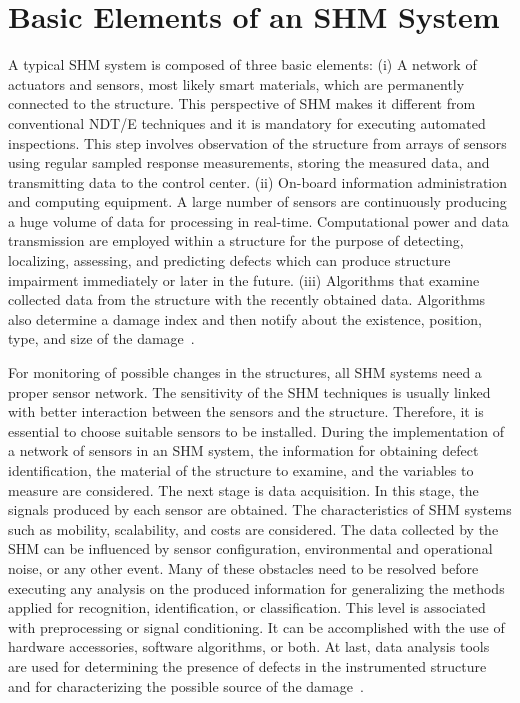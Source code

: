 \documentclass[b5paper, 11pt, titlepage]{book}
\begin{document}
\section{Basic Elements of an SHM System}
A typical SHM system is composed of three basic elements: (i) A network of actuators and sensors, most likely smart materials, which are permanently connected to the structure. This perspective of SHM makes it different from conventional NDT/E techniques and it is mandatory for executing automated inspections. This step involves observation of the structure from arrays of sensors using regular sampled response measurements, storing the measured data, and transmitting data to the control center. (ii) On-board information administration and computing equipment. A large number of sensors are continuously producing a huge volume of data for processing in real-time. Computational power and data transmission are employed within a structure for the purpose of detecting, localizing, assessing, and predicting defects which can produce structure impairment immediately or later in the future. (iii) Algorithms that examine collected data from the structure with the recently obtained data. Algorithms also determine a damage index and then notify about the existence, position, type, and size of the damage~\cite{stepinski2013advanced, Guemes2020a, lee2008overview, Crane2017}.

For monitoring of possible changes in the structures, all SHM systems need a proper sensor network. The sensitivity of the SHM techniques is usually linked with better interaction between the sensors and the structure. Therefore, it is essential to choose suitable sensors to be installed. During the implementation of a network of sensors in an SHM system, the information for obtaining defect identification, the material of the structure to examine, and the variables to measure are considered. The next stage is data acquisition. In this stage, the signals produced by each sensor are obtained. The characteristics of SHM systems such as mobility, scalability, and costs are considered. The data collected by the SHM can be influenced by sensor configuration, environmental and operational noise, or any other event. Many of these obstacles need to be resolved before executing any analysis on the produced information for generalizing the methods applied for recognition, identification, or classification. This level is associated with preprocessing or signal conditioning. It can be accomplished with the use of hardware accessories, software algorithms, or both. At last, data analysis tools are used for determining the presence of defects in the instrumented structure and for characterizing the possible source of the damage~\cite{TibaduizaBurgos2020,Crane2017}.
\end{document}
